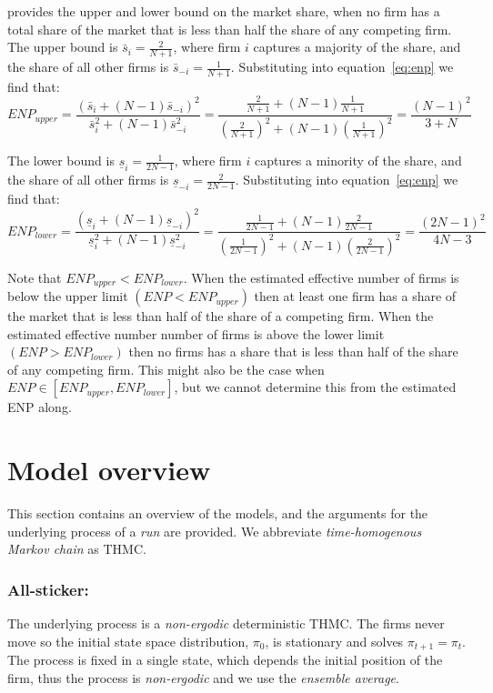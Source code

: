 \documentclass[preprint, 12pt]{elsarticle}
\begin{document}
\citet{Eaton_Lipsey_1975} provides the upper and lower bound on the market share, when no firm has a total share of the market that is less than half the share of any competing firm. The upper bound is ${\bar s}_i = \frac{2}{N+1}$, where firm $i$ captures a majority of the share, and the share of all other firms is ${\bar s}_{-i} = \frac{1}{N+1}$. Substituting into equation~\ref{eq:enp} we find that:
\begin{equation}
	ENP_{upper} = \frac{\left( {\bar s}_i + (N-1) {\bar s}_{-i} \right)^2}{{\bar s}_i^2 + (N-1) {\bar s}_{-i}^2} = \frac{\frac{2}{N+1} + (N-1) \frac{1}{N+1}}{\left(\frac{2}{N+1}\right)^2 + (N-1)\left(\frac{1}{N+1}\right)^2} = \frac{(N-1)^2}{3+N}
\end{equation}

The lower bound is ${\underline s}_i = \frac{1}{2N-1}$, where firm $i$ captures a minority of the share, and the share of all other firms is ${\underline s}_{-i} = \frac{2}{2N-1}$. Substituting into equation~\ref{eq:enp} we find that:
\begin{equation}
	ENP_{lower} = \frac{\left( {\underline s}_i + (N-1) {\underline s}_{-i} \right)^2}{{\underline s}_i^2 + (N-1) {\underline s}_{-i}^2} = \frac{\frac{1}{2N-1} + (N-1) \frac{2}{2N-1}}{\left(\frac{1}{2N-1}\right)^2 + (N-1)\left(\frac{2}{2N-1}\right)^2} = \frac{(2N-1)^2}{4N-3}
\end{equation}

Note that $ENP_{upper} < ENP_{lower}$. When the estimated effective number of firms is below the upper limit $(ENP < ENP_{upper})$ then at least one firm has a share of the market that is less than half of the share of a competing firm. When the estimated effective number number of firms is above the lower limit $(ENP > ENP_{lower})$ then no firms has a share that is less than half of the share of any competing firm. This might also be the case when $ENP \in [ENP_{upper}, ENP_{lower}]$, but we cannot determine this from the estimated ENP along.

\section{Model overview}
\label{app:overview}

This section contains an overview of the models, and the arguments for the underlying process of a \emph{run} are provided. We abbreviate \emph{time-homogenous Markov chain} as THMC.

\subsubsection*{All-sticker:}
The underlying process is a \emph{non-ergodic} deterministic THMC. The firms never move so the initial state space distribution, $\pi_0$, is stationary and solves $\pi_{t+1} = \pi_t$. The process is fixed in a single state, which depends the initial position of the firm, thus the process is \emph{non-ergodic} and we use the \emph{ensemble average}.
\end{document}
